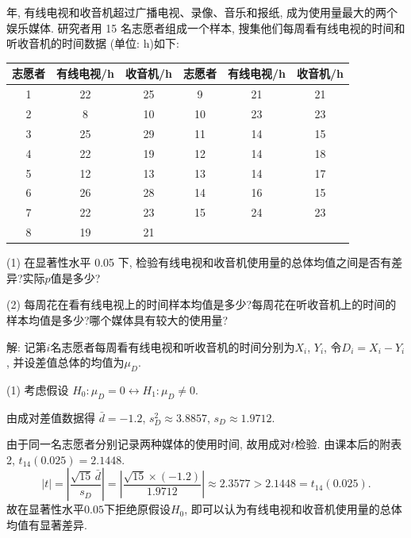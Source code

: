 \documentclass[standard]{ExBook}
\renewenvironment{shaded}{%
  \def\FrameCommand{\fboxsep=\FrameSep \colorbox{shadecolor}}%
  \MakeFramed{\advance\hsize-\width \FrameRestore}%
}{%
  \endMakeFramed
}
\begin{document}
\begin{qitems}
\vspace{2.5cm-5em}

    \begin{bbox}
    \begin{shaded}
         年, 有线电视和收音机超过广播电视、录像、音乐和报纸, 成为使用量最大的两个娱乐媒体. 研究者用 15 名志愿者组成一个样本, 搜集他们每周看有线电视的时间和听收音机的时间数据 (单位: h)如下:
\begin{center}
\setlength{\tabcolsep}{16pt}
\begin{tabular}{ccc||ccc}
\hline
志愿者 & 有线电视/h & 收音机/h & 志愿者 & 有线电视/h & 收音机/h\\
\hline
1 & 22 & 25 & 9 & 21 & 21 \\
2 & 8 & 10 & 10 & 23 & 23 \\
3 & 25 & 29 & 11 & 14 & 15 \\
4 & 22 & 19 & 12 & 14 & 18 \\
5 & 12 & 13 & 13 & 14 & 17 \\
6 & 26 & 28 & 14 & 16 & 15 \\
7 & 22 & 23 & 15 & 24 & 23 \\
8 & 19 & 21 &  &  &  \\
\hline
\end{tabular}
\end{center}
(1) 在显著性水平 0.05 下, 检验有线电视和收音机使用量的总体均值之间是否有差异?实际$p$值是多少?

(2) 每周花在看有线电视上的时间样本均值是多少?每周花在听收音机上的时间的样本均值是多少?哪个媒体具有较大的使用量?
    \end{shaded}
    \end{bbox}

\vspace{\dimexpr2.5cm-5em\relax}

解: 记第$i$名志愿者每周看有线电视和听收音机的时间分别为$X_i$, $Y_i$, 令$D_i=X_i-Y_i$, 并设差值总体的均值为$\mu_D$.

(1) 考虑假设
$
H_0:\mu_D=0
\longleftrightarrow
H_1:\mu_D\neq0
$.

由成对差值数据得
$
\bar{d}=-1.2
$,
$
s_D^2\approx3.8857
$,
$
s_D\approx1.9712
$.

由于同一名志愿者分别记录两种媒体的使用时间, 故用成对$t$检验. 由课本后的附表2, $t_{14}(0.025)=2.1448$.
$$
|t|
=
\left|
\frac{\sqrt{15}\,\bar{d}}{s_D}
\right|
=
\left|
\frac{\sqrt{15}\times(-1.2)}{1.9712}
\right|
\approx2.3577
>
2.1448
=
t_{14}(0.025).
$$
故在显著性水平$0.05$下拒绝原假设$H_0$, 即可以认为有线电视和收音机使用量的总体均值有显著差异.


\end{qitems}
\end{document}
